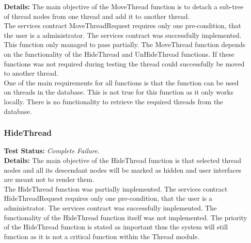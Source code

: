 \begin{flushleft}
\begin{flushleft}
	\textbf{Details:}
	The main objective of the MoveThread function is to detach a sub-tree of thread nodes from one thread and add it to another thread.\\
	The services contract MoveThreadRequest requires only one pre-condition, that the user is a administrator.
	The services contract was successfully implemented. This function only managed to pass partially. The MoveThread function depends on the functionality of the HideThread and UnHideThread functions. If these functions was not required during testing the thread could successfully be moved to another thread.\\
	One of the main requirements for all functions is that the function can be used on threads in the database. This is not true for this function as it only works locally. There is no functionality to retrieve the required threads from the database.

\end{flushleft}

\subsubsection{HideThread}
\begin{flushleft}
	\textbf{Test Status:} \emph{Complete Failure}. \\

	\textbf{Details:}
	The main objective of the HideThread function is that selected thread nodes and all	its descendant nodes will be marked as hidden and user interfaces are meant not to render them.\\
	The HideThread function was partially implemented. The services contract HideThreadRequest requires only one pre-condition, that the user is a administrator. The services contract was successfully implemented. The functionality of the HideThread function itself was not implemented. The priority of the HideThread function is stated as important thus the system will still function as it is not a critical function within the Thread module.
  
\end{flushleft}

\end{flushleft}

